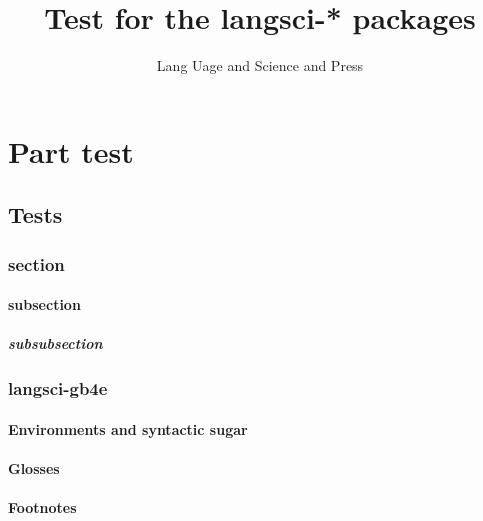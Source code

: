 \documentclass[output=book
  ,colorlinks
  ,showindex
  ]{langscibook}
\title{Test for the langsci-* packages}
\author{Lang Uage and Science and Press}
\begin{document}
\renewcommand{\lsImpressumExtra}{Manuscript submitted in fulfillment of entering the Galactical Hall of Fame.}


\maketitle
\tableofcontents
\mainmatter

%
%
%
\part{Part test}
\chapter{Tests}
\section{section}
\subsection{subsection}
\subsubsection{subsubsection}
\section{langsci-gb4e}
\subsection{Environments and syntactic sugar}









% 
%
%
\subsection{Glosses}






\subsection{Footnotes}



\end{document}
